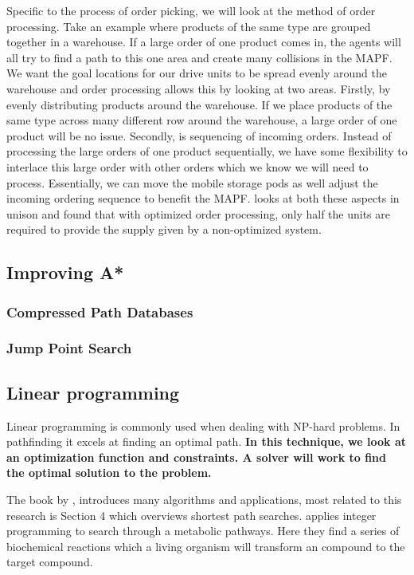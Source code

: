 \documentclass[a4paper,11pt]{article}
\begin{document}
Specific to the process of order picking, we will look at the method of order processing. Take an example where products of the same type are grouped together in a warehouse. If a large order of one product comes in, the agents will all try to find a path to this one area and create many collisions in the MAPF. We want the goal locations for our drive units to be spread evenly around the warehouse and order processing allows this by looking at two areas. Firstly, by evenly distributing products around the warehouse. If we place products of the same type across many different row around the warehouse, a large order of one product will be no issue. Secondly, is sequencing of incoming orders. Instead of processing the large orders of one product sequentially, we have some flexibility to interlace this large order with other orders which we know we will need to process. Essentially, we can move the mobile storage pods as well adjust the incoming ordering sequence to benefit the MAPF. \cite{boysen2017parts} looks at both these aspects in unison and found that with optimized order processing, only half the units are required to provide the supply given by a non-optimized system.

\subsection{Improving A*}

\subsubsection{Compressed Path Databases}

\subsubsection{Jump Point Search}

\cite{renukamurthy2016improving}

\subsection{Linear programming}
Linear programming is commonly used when dealing with NP-hard problems. In pathfinding it excels at finding an optimal path. \textbf{In this technique, we look at an optimization function and constraints. A solver will work to find the optimal solution to the problem.}

The book by \cite{ahuja1993network}, introduces many algorithms and applications, most related to this research is Section 4 which overviews shortest path searches. \cite{planes2009path} applies integer programming to search through a metabolic pathways. Here they find a series of biochemical reactions which a living organism will transform an compound to the target compound.
\end{document}
